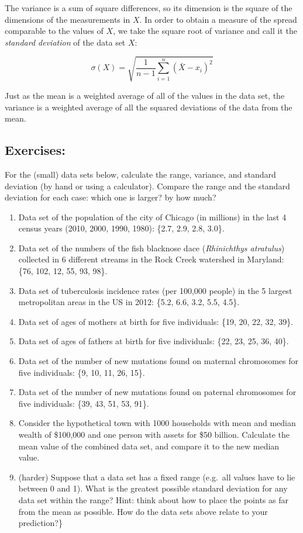 \documentclass[
  letterpaper,
  DIV=11,
  numbers=noendperiod]{scrreprt}
\begin{document}
The variance is a sum of square differences, so its dimension is the
square of the dimensions of the measurements in \(X\). In order to
obtain a measure of the spread comparable to the values of \(X\), we
take the square root of variance and call it the
 \emph{standard deviation} of the data
set \(X\):

\begin{equation}
\sigma(X) = \sqrt{\frac{1}{n-1} \sum_{i=1}^n (\bar X - x_i)^2}
\end{equation}

Just as the mean is a weighted average of all of the values in the data
set, the variance is a weighted average of all the squared deviations of
the data from the mean.

\hypertarget{exercises-7}{%
\subsection{Exercises:}\label{exercises-7}}

For the (small) data sets below, calculate the range, variance, and
standard deviation (by hand or using a calculator). Compare the range
and the standard deviation for each case: which one is larger? by how
much?

\begin{enumerate}
\def\labelenumi{\arabic{enumi}.}
\item
  Data set of the population of the city of Chicago (in millions) in the
  last 4 census years (2010, 2000, 1990, 1980): \{2.7, 2.9, 2.8, 3.0\}.
\item
  Data set of the numbers of the fish blacknose dace (\emph{Rhinichthys
  atratulus}) collected in 6 different streams in the Rock Creek
  watershed in Maryland: \{76, 102, 12, 55, 93, 98\}.
\item
  Data set of tuberculosis incidence rates (per 100,000 people) in the 5
  largest metropolitan areas in the US in 2012: \{5.2, 6.6, 3.2, 5.5,
  4.5\}.
\item
  Data set of ages of mothers at birth for five individuals: \{19, 20,
  22, 32, 39\}.
\item
  Data set of ages of fathers at birth for five individuals: \{22, 23,
  25, 36, 40\}.
\item
  Data set of the number of new mutations found on maternal chromosomes
  for five individuals: \{9, 10, 11, 26, 15\}.
\item
  Data set of the number of new mutations found on paternal chromosomes
  for five individuals: \{39, 43, 51, 53, 91\}.
\item
  Consider the hypothetical town with 1000 households with mean and
  median wealth of \$100,000 and one person with assets for \$50
  billion. Calculate the mean value of the combined data set, and
  compare it to the new median value.
\item
  (harder) Suppose that a data set has a fixed range (e.g.~all values
  have to lie between 0 and 1). What is the greatest possible standard
  deviation for any data set within the range? Hint: think about how to
  place the points as far from the mean as possible. How do the data
  sets above relate to your prediction?\}
\end{enumerate}
\end{document}
